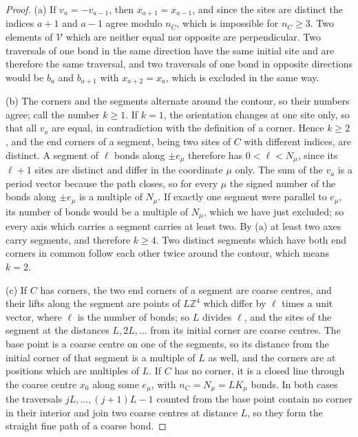 \documentclass[11pt]{article}
\numberwithin{equation}{section}
\theoremstyle{remark}
\theoremstyle{plain}
\begin{document}
\begin{proof}
(a) If $v_a=-v_{a-1}$, then $x_{a+1}= x_{a-1}$, and since the sites are distinct the indices $a+1$ and $a-1$ agree modulo $n_C$, which is impossible for $n_C\geqslant 3$. Two elements of $\mathscr V$ which are neither equal nor opposite are perpendicular. Two traversals of one bond in the same direction have the same initial site and are therefore the same traversal, and two traversals of one bond in opposite directions would be $b_a$ and $b_{a+1}$ with $x_{a+2}= x_a$, which is excluded in the same way.

(b) The corners and the segments alternate around the contour, so their numbers agree; call the number $k\geqslant 1$. If $k=1$, the orientation changes at one site only, so that all $v_a$ are equal, in contradiction with the definition of a corner. Hence $k\geqslant 2$, and the end corners of a segment, being two sites of $C$ with different indices, are distinct. A segment of $\ell$ bonds along $\pm e_{\mu}$ therefore has $0<\ell< N_{\mu}$, since its $\ell+1$ sites are distinct and differ in the coordinate $\mu$ only. The sum of the $v_a$ is a period vector because the path closes, so for every $\mu$ the signed number of the bonds along $\pm e_{\mu}$ is a multiple of $N_{\mu}$. If exactly one segment were parallel to $e_{\mu}$, its number of bonds would be a multiple of $N_{\mu}$, which we have just excluded; so every axis which carries a segment carries at least two. By (a) at least two axes carry segments, and therefore $k\geqslant 4$. Two distinct segments which have both end corners in common follow each other twice around the contour, which means $k=2$.

(c) If $C$ has corners, the two end corners of a segment are coarse centres, and their lifts along the segment are points of $L\mathbb Z^4$ which differ by $\ell$ times a unit vector, where $\ell$ is the number of bonds; so $L$ divides $\ell$, and the sites of the segment at the distances $L,2L,\ldots$ from its initial corner are coarse centres. The base point is a coarse centre on one of the segments, so its distance from the initial corner of that segment is a multiple of $L$ as well, and the corners are at positions which are multiples of $L$. If $C$ has no corner, it is a closed line through the coarse centre $x_0$ along some $e_{\mu}$, with $n_C= N_{\mu}= LK_{\mu}$ bonds. In both cases the traversals $jL,\ldots,(j+1)L-1$ counted from the base point contain no corner in their interior and join two coarse centres at distance $L$, so they form the straight fine path of a coarse bond.


\end{proof}
\end{document}
